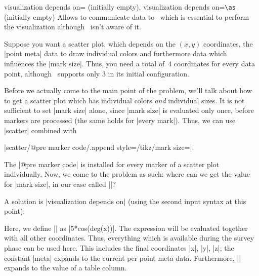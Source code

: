 \begin{pgfplotskeylist}{%
	visualization depends on= (initially empty),%
	visualization depends on=\texttt{\textbackslash as} (initially empty)}
	Allows to communicate data to \PGFPlots\ which is essential to perform the visualization although \PGFPlots\ isn't aware of it.

	Suppose you want a scatter plot, which depends on the $(x,y)$ coordinates, the |point meta| data to draw individual colors and furthermore data which influences the |mark size|. Thus, you need a total of~$4$ coordinates for every data point, although \PGFPlots\ supports only $3$ in its initial configuration.
	
	Before we actually come to the main point of the problem, we'll talk about how to get a scatter plot which has individual colors \emph{and} individual sizes. It is not sufficient to set |mark size| alone, since |mark size| is evaluated only once, before markers are processed (the same holds for |every mark|). Thus, we can use |scatter| combined with

	|scatter/@pre marker code/.append style={/tikz/mark size=\perpointmarksize}|.

	\noindent The |@pre marker code| is installed for every marker of a scatter plot individually. Now, we come to the problem as such: where can we get the value for |mark size|, in our case called |\perpointmarksize|?
	
	A solution is |visualization depends on| (using the second input syntax at this point):
\begin{codeexample}[]
\end{codeexample}
	
	Here, we define |\perpointmarksize| as |5*cos(deg(x))|. The expression will be evaluated together with all other coordinates. Thus, everything which is available during the survey phase can be used here. This includes the final coordinates |x|, |y|, |z|; the constant |meta| expands to the current per point meta data. Furthermore, |\thisrow| expands to the value of a table column.


\end{pgfplotskeylist}
